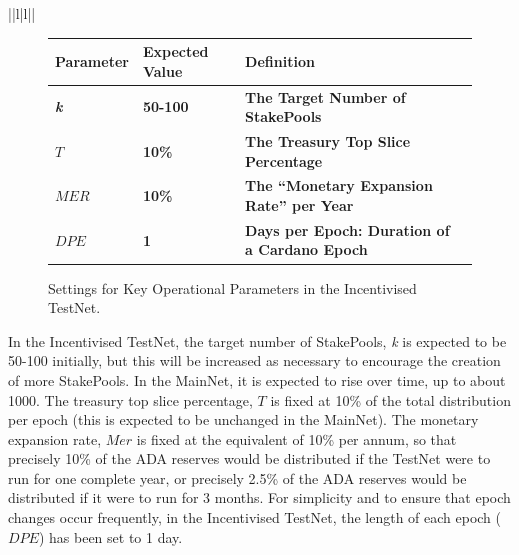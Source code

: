 \documentclass[11pt,a4paper,dvipsnames,twosided,final]{article}
\newcommand{\ada}{ADA{}}
\newcommand{\cardano}[1]{Cardano}
\begin{document}
\begin{tabular}{||l|l||}
\begin{figure}[h!]
\begin{center}
\begin{tabular}{||l|l|p{10cm}|l||}
  \hline \hline
\textbf{Parameter} & \textbf{Expected Value} & \textbf{Definition} \\\hline
\textbf{\color{green} \emph{k}} & \textbf{\color{green} 50-100} &\textbf{\color{green}  The Target Number of StakePools} \\\hline
\textbf{\color{green} $T$} & \textbf{\color{green} 10\%} & \textbf{\color{green} The Treasury Top Slice Percentage} \\\hline
\textbf{\color{green} $\textit{MER}$} & \textbf{\color{green} 10\%}&  \textbf{\color{green} The ``Monetary Expansion Rate'' per Year}\\\hline
\textbf{\color{green} $\textit{DPE}$} & \textbf{\color{green} 1} & \textbf{\color{green}  Days per Epoch: Duration of a \cardano{} Epoch} \\\hline
  \hline
\end{tabular}
\end{center}
\caption{Settings for Key Operational Parameters in the Incentivised TestNet.}
\end{figure}

\noindent
In the Incentivised TestNet,
the target number of StakePools, \emph{k} is expected to be 50-100 initially, but this will be increased as necessary to encourage the creation of more StakePools.
In the MainNet, it is expected to rise over time, up to about 1000.
The treasury top slice percentage, $T$ is fixed at 10\% of the total distribution per epoch (this is expected to be unchanged in the MainNet).
The monetary expansion rate, $\textit{Mer}$ is fixed at the equivalent of 10\% per annum, so that precisely 10\% of the \ada{} reserves would be distributed
if the TestNet were to run for one complete year, or precisely 2.5\% of the \ada{} reserves would be distributed if it were to run for 3 months.
For simplicity and to ensure that epoch changes occur frequently, in the Incentivised TestNet, the length of each epoch ($\textit{DPE}$) has been set to 1 day.


\end{tabular}
\end{document}
